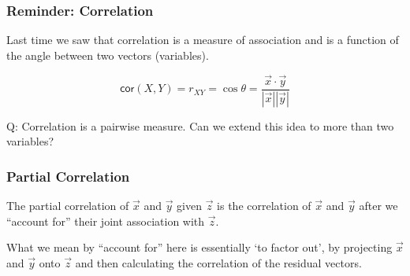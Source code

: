 \documentclass{beamer}
\begin{document}
\begin{frame}
  \frametitle{Reminder: Correlation}

Last time we saw that correlation is a measure of association and is a function of the angle between two vectors (variables).

\begin{center}

\end{center}

\[
\mathsf{cor}(X,Y) = r_{XY} = \cos \theta = \frac{\vec{x} \cdot \vec{y}}{|\vec{x}||\vec{y}|}
\]


\alert{Q: Correlation is a pairwise measure. Can we extend this idea to more than two variables?}
\end{frame}



\begin{frame}
  \frametitle{Partial Correlation}

{\small
The partial correlation of $\vec{x}$ and $\vec{y}$ given $\vec{z}$ is the correlation of $\vec{x}$ and $\vec{y}$ after we ``account for'' their joint association with $\vec{z}$.  

\medskip

What we mean by ``account for'' here is essentially `to factor out', by projecting $\vec{x}$ and $\vec{y}$ onto $\vec{z}$ and then calculating the correlation of the residual vectors.

}

\begin{center}
\end{center}

\end{frame}



\end{document}
